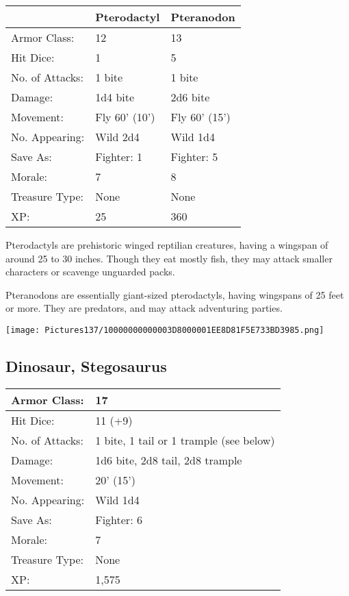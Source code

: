 \documentclass[a4paper,twoside,openany,10pt]{book}
\begin{document}
\begin{multicols}{2}
\begin{tabularx}{0.48\textwidth}{lXX}
& Pterodactyl & Pteranodon \\\hline
Armor Class: & 12 & 13 \\\hline
Hit Dice: & 1 & 5 \\\hline
No. of Attacks: & 1 bite & 1 bite \\\hline
Damage: & 1d4 bite & 2d6 bite \\\hline
Movement: & Fly 60' (10') & Fly
60' (15') \\\hline
No. Appearing: & Wild 2d4 & Wild 1d4 \\\hline
Save As: & Fighter: 1 & Fighter: 5 \\\hline
Morale: & 7 & 8 \\\hline
Treasure Type: & None & None \\\hline
XP: & 25 & 360 \\\hline
\end{tabularx}\medskip

Pterodactyls are prehistoric winged reptilian creatures, having a wingspan of around 25 to 30 inches. Though they eat mostly fish, they may attack smaller characters or scavenge unguarded packs.

Pteranodons are essentially giant-sized pterodactyls, having wingspans of 25 feet or more. They are predators, and may attack adventuring parties.

\begin{center}
	\texttt{[image: Pictures137/10000000000003D8000001EE8D81F5E733BD3985.png]}
\end{center}

\subsection*{Dinosaur, Stegosaurus}\label{dinosaur-stegosaurus}

\begin{tabularx}{0.48\textwidth}{@{}lX@{}}
Armor Class: & 17 \\\hline
Hit Dice: & 11 (+9) \\\hline
No. of Attacks: & 1 bite, 1 tail or 1 trample (see below) \\\hline
Damage: & 1d6 bite, 2d8 tail, 2d8 trample \\\hline
Movement: & 20' (15') \\\hline
No. Appearing: & Wild 1d4 \\\hline
Save As: & Fighter: 6 \\\hline
Morale: & 7 \\\hline
Treasure Type: & None \\\hline
XP: & 1,575 \\\hline
\end{tabularx}\medskip


\end{multicols}
\end{document}
